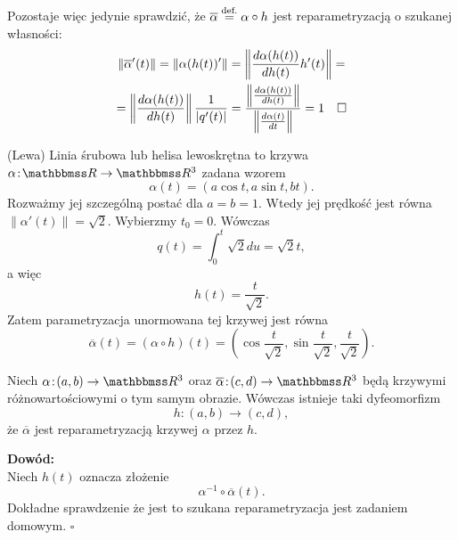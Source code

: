 \begin{frame}[<+->]
Pozostaje więc jedynie sprawdzić, że $\overline{\alpha}\define\alpha\circ h$ jest reparametryzacją o szukanej własności:
\pause\begin{multline*}
\|\overline{\alpha}'(t)\|=\le\|\alpha(h(t))'\ri\|=\le\|\frac{d\alpha(h(t))}{dh(t)}h'(t)\ri\|=\\=\le\|\frac{d\alpha(h(t))}{dh(t)}\ri\|\frac{1}{|q'(t)|}=\frac{\le\|\frac{d\alpha(h(t))}{dh(t)}\ri\|}{\le\|\frac{d\alpha(t)}{dt}\ri\|}=1\quad\square
\end{multline*}
\end{frame}
\begin{frame}[<+->]
\begin{przyklad}
(Lewa) Linia śrubowa lub helisa lewoskrętna to krzywa $\alpha\colon \R\to \R^3$ zadana wzorem
\[\alpha(t)=(a\cos{t},a\sin{t},bt).\]
Rozważmy jej szczególną postać dla $a=b=1$. Wtedy jej prędkość jest równa $\|\alpha'(t)\|=\sqrt{2}$. Wybierzmy $t_0=0$. Wówczas \[q(t)=\int_0^t\sqrt{2} du=\sqrt{2}t,\] a więc \[h(t)=\frac{t}{\sqrt{2}}.\] Zatem parametryzacja unormowana tej krzywej jest równa \[\overline{\alpha}(t)=(\alpha\circ h)(t)=\left(\cos{\frac{t}{\sqrt{2}}},\sin{\frac{t}{\sqrt{2}}},\frac{t}{\sqrt{2}}\right)\!.\]
\end{przyklad}

\end{frame}
\begin{frame}[<+->]

\begin{center}
\begin{tikzpicture}[y=0.80pt, x=0.8pt,scale=0.7,yscale=-1, inner sep=0pt, outer sep=0pt]

\end{tikzpicture}
\end{center}
\end{frame}
\begin{frame}

\begin{lemat}
Niech $\alpha\colon (a,b)\to \R^3$ oraz $\overline{\alpha}\colon (c,d)\to \R^3$ będą krzywymi różnowartościowymi o tym samym obrazie. Wówczas istnieje taki dyfeomorfizm \[h\colon (a,b)\to (c,d),\] że $\overline{\alpha}$ jest reparametryzacją krzywej $\alpha$ przez $h$.
\end{lemat}
\pause \textcolor{ared}{\textbf{Dowód:}}\\
Niech $h(t)$ oznacza złożenie \[\alpha^{-1}\circ \overline{\alpha} (t).\] Dokładne sprawdzenie że jest to szukana reparametryzacja jest zadaniem domowym.
\hfill $\square$

\end{frame}
